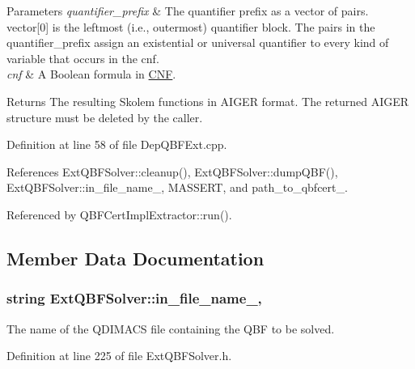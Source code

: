 \begin{DoxyParams}{Parameters}
{\em quantifier\-\_\-prefix} & The quantifier prefix as a vector of pairs. vector\mbox{[}0\mbox{]} is the leftmost (i.\-e., outermost) quantifier block. The pairs in the quantifier\-\_\-prefix assign an existential or universal quantifier to every kind of variable that occurs in the cnf. \\
\hline
{\em cnf} & A Boolean formula in \hyperlink{classCNF}{C\-N\-F}. \\
\hline
\end{DoxyParams}
\begin{DoxyReturn}{Returns}
The resulting Skolem functions in A\-I\-G\-E\-R format. The returned A\-I\-G\-E\-R structure must be deleted by the caller. 
\end{DoxyReturn}


Definition at line 58 of file Dep\-Q\-B\-F\-Ext.\-cpp.



References Ext\-Q\-B\-F\-Solver\-::cleanup(), Ext\-Q\-B\-F\-Solver\-::dump\-Q\-B\-F(), Ext\-Q\-B\-F\-Solver\-::in\-\_\-file\-\_\-name\-\_\-, M\-A\-S\-S\-E\-R\-T, and path\-\_\-to\-\_\-qbfcert\-\_\-.



Referenced by Q\-B\-F\-Cert\-Impl\-Extractor\-::run().



\subsection{Member Data Documentation}
\hypertarget{classExtQBFSolver_a04d2ff483c22a11344e46d66ae7e76b1}{
\subsubsection[{in\-\_\-file\-\_\-name\-\_\-}]{\setlength{\rightskip}{0pt plus 5cm}string Ext\-Q\-B\-F\-Solver\-::in\-\_\-file\-\_\-name\-\_\-\hspace{0.3cm}{\ttfamily [protected]}, {\ttfamily [inherited]}}}\label{classExtQBFSolver_a04d2ff483c22a11344e46d66ae7e76b1}


The name of the Q\-D\-I\-M\-A\-C\-S file containing the Q\-B\-F to be solved. 



Definition at line 225 of file Ext\-Q\-B\-F\-Solver.\-h.



